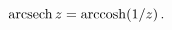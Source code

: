 \[\mathop{\mathrm{arcsech}\/}\nolimits z=\mathop{\mathrm{arccosh}\/}\nolimits\!%
\left(1/z\right).\]